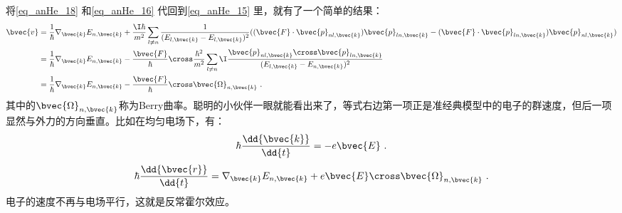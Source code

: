 将\autoref{eq_anHe_18} 和\autoref{eq_anHe_16} 代回到\autoref{eq_anHe_15} 里，就有了一个简单的结果：
\begin{equation}
\begin{aligned}
\bvec{v}&=\frac{1}{\hbar}\nabla_{\bvec{k}}E_{n,\bvec{k}}+\frac{\I\hbar}{m^2}\sum_{l\neq n}\frac{1}{(E_{l,\bvec{k}}-E_{l,\bvec{k}})^2}((\bvec{F}\cdot\bvec{p}_{nl,\bvec{k}})\bvec{p}_{ln,\bvec{k}}-(\bvec{F}\cdot\bvec{p}_{ln,\bvec{k}})\bvec{p}_{nl,\bvec{k}})\\
&=\frac{1}{\hbar}\nabla_{\bvec{k}}E_{n,\bvec{k}}-\frac{\bvec{F}}{\hbar}\cross\frac{\hbar^2}{m^2}\sum_{l\neq n}\I\frac{\bvec{p}_{nl,\bvec{k}}\cross\bvec{p}_{ln,\bvec{k}}}{(E_{l,\bvec{k}}-E_{n,\bvec{k}})^2}\\
&=\frac{1}{\hbar}\nabla_{\bvec{k}}E_{n,\bvec{k}}-\frac{\bvec{F}}{\hbar}\cross\bvec{\Omega}_{n,\bvec{k}}~.
\end{aligned}
\end{equation}
其中的$\bvec{\Omega}_{n,\bvec{k}}$称为Berry曲率。聪明的小伙伴一眼就能看出来了，等式右边第一项正是准经典模型中的电子的群速度，但后一项显然与外力的方向垂直。比如在均匀电场下，有：
\begin{equation}
\hbar\frac{\dd{\bvec{k}}}{\dd{t}}=-e\bvec{E}~.
\end{equation}
\begin{equation}
\hbar\frac{\dd{\bvec{r}}}{\dd{t}}=\nabla_{\bvec{k}}E_{n,\bvec{k}}+e\bvec{E}\cross\bvec{\Omega}_{n,\bvec{k}}~.
\end{equation}
电子的速度不再与电场平行，这就是反常霍尔效应。






